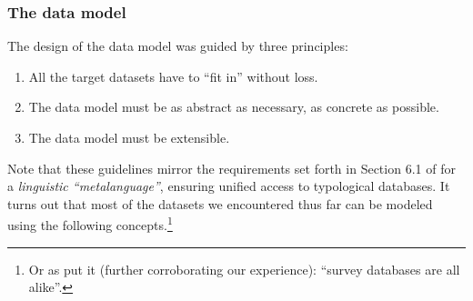 \documentclass[a4paper,10pt]{article}
\begin{document}


\subsubsection{The data model}
\label{sec:datamodel}

The design of the data model was guided by three principles:
\begin{enumerate}
\item All the target datasets have to ``fit in'' without loss.
\item The data model must be as abstract as necessary, as concrete as possible.
\item The data model must be extensible.
\end{enumerate}

Note that these guidelines mirror the requirements set forth in Section 6.1 of 
for a \emph{linguistic ``metalanguage''}, ensuring unified access to typological databases.
It turns out that most of the datasets we encountered thus far can be modeled using the
following concepts.\footnote{Or as  put it (further corroborating our experience):
``survey databases are all alike''.}

%
%
\end{document}

